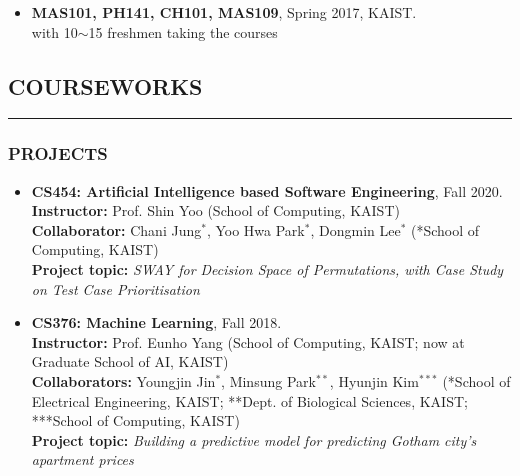\documentclass[10pt,a4]{article}
\begin{document}
\begin{small}
\begin{itemize}
\item {\bf MAS101, PH141, CH101, MAS109}, Spring 2017, KAIST. \\
with 10$\sim$15 freshmen taking the courses


\end{itemize}



\subsection*{COURSEWORKS}
\hrule
\vspace{0.2cm}

\subsubsection*{PROJECTS}
\begin{itemize}
	
	\item {\bf CS454: Artificial Intelligence based Software Engineering}, Fall 2020. \\
	{\bf Instructor:} Prof. Shin Yoo (School of Computing, KAIST) \\
	{\bf Collaborator:} Chani Jung$^{*}$, Yoo Hwa Park$^{*}$, Dongmin Lee$^{*}$ (*School of Computing, KAIST) \\
	{\bf Project topic:} {\it SWAY for Decision Space of Permutations, with Case Study on Test Case Prioritisation} \\
	
	\item {\bf CS376: Machine Learning}, Fall 2018. \\
	{\bf Instructor:} Prof. Eunho Yang (School of Computing, KAIST; now at Graduate School of AI, KAIST) \\
	{\bf Collaborators:} Youngjin Jin$^{*}$, Minsung Park$^{**}$, Hyunjin Kim$^{***}$ (*School of Electrical Engineering, KAIST; **Dept. of Biological Sciences, KAIST; ***School of Computing, KAIST) \\
	{\bf Project topic:} {\it Building a predictive model for predicting Gotham city's apartment prices} \\
	

\end{itemize}
\end{small}
\end{document}
